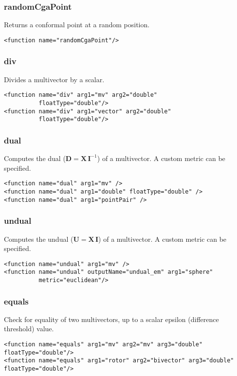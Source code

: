 \documentclass[10pt, a4paper]{article}
\newcommand{\gav}[1]{\ensuremath{\mathbf{#1}}}
\newcommand{\gp}{\,}
\newcommand{\inv}[1]{{#1}^{-1}}
\begin{document}
\subsubsection*{randomCgaPoint}

Returns a conformal point at a random position.
\begin{verbatim}
<function name="randomCgaPoint"/>
\end{verbatim}

\subsubsection*{div}

Divides a multivector by a scalar.
\begin{verbatim}
<function name="div" arg1="mv" arg2="double" 
          floatType="double"/>
<function name="div" arg1="vector" arg2="double" 
          floatType="double"/>
\end{verbatim}

\subsubsection*{dual}

Computes the dual ($\gav{D} = \gav{X} \gp \inv{\gav{I}}$) of a multivector. A custom metric can be specified.
\begin{verbatim}
<function name="dual" arg1="mv" />
<function name="dual" arg1="double" floatType="double" />
<function name="dual" arg1="pointPair" />
\end{verbatim}

\subsubsection*{undual}

Computes the undual ($\gav{U} = \gav{X} \gp \gav{I}$) of a multivector. A custom metric can be specified.
\begin{verbatim}
<function name="undual" arg1="mv" />
<function name="undual" outputName="undual_em" arg1="sphere" 
          metric="euclidean"/>
\end{verbatim}

\subsubsection*{equals}

Check for equality of two multivectors, up to a scalar epsilon (difference threshold) value.
\begin{verbatim}
<function name="equals" arg1="mv" arg2="mv" arg3="double" floatType="double"/>
<function name="equals" arg1="rotor" arg2="bivector" arg3="double" floatType="double"/>
\end{verbatim}
\end{document}
